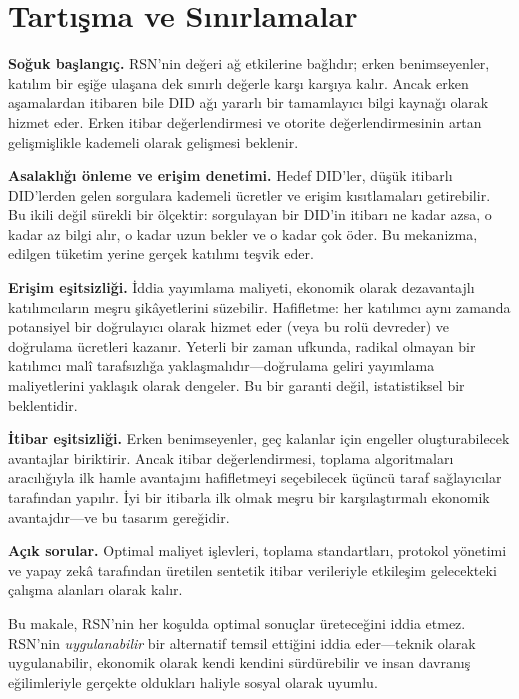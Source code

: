 \documentclass[11pt,a4paper,twocolumn]{article}
\begin{document}
\section{Tartışma ve Sınırlamalar}

\textbf{Soğuk başlangıç.} RSN'nin değeri ağ etkilerine bağlıdır; erken benimseyenler, katılım bir eşiğe ulaşana dek sınırlı değerle karşı karşıya kalır. Ancak erken aşamalardan itibaren bile DID ağı yararlı bir tamamlayıcı bilgi kaynağı olarak hizmet eder. Erken itibar değerlendirmesi ve otorite değerlendirmesinin artan gelişmişlikle kademeli olarak gelişmesi beklenir.

\textbf{Asalaklığı önleme ve erişim denetimi.} Hedef DID'ler, düşük itibarlı DID'lerden gelen sorgulara kademeli ücretler ve erişim kısıtlamaları getirebilir. Bu ikili değil sürekli bir ölçektir: sorgulayan bir DID'in itibarı ne kadar azsa, o kadar az bilgi alır, o kadar uzun bekler ve o kadar çok öder. Bu mekanizma, edilgen tüketim yerine gerçek katılımı teşvik eder.

\textbf{Erişim eşitsizliği.} İddia yayımlama maliyeti, ekonomik olarak dezavantajlı katılımcıların meşru şikâyetlerini süzebilir. Hafifletme: her katılımcı aynı zamanda potansiyel bir doğrulayıcı olarak hizmet eder (veya bu rolü devreder) ve doğrulama ücretleri kazanır. Yeterli bir zaman ufkunda, radikal olmayan bir katılımcı malî tarafsızlığa yaklaşmalıdır---doğrulama geliri yayımlama maliyetlerini yaklaşık olarak dengeler. Bu bir garanti değil, istatistiksel bir beklentidir.

\textbf{İtibar eşitsizliği.} Erken benimseyenler, geç kalanlar için engeller oluşturabilecek avantajlar biriktirir. Ancak itibar değerlendirmesi, toplama algoritmaları aracılığıyla ilk hamle avantajını hafifletmeyi seçebilecek üçüncü taraf sağlayıcılar tarafından yapılır. İyi bir itibarla ilk olmak meşru bir karşılaştırmalı ekonomik avantajdır---ve bu tasarım gereğidir.

\textbf{Açık sorular.} Optimal maliyet işlevleri, toplama standartları, protokol yönetimi ve yapay zekâ tarafından üretilen sentetik itibar verileriyle etkileşim gelecekteki çalışma alanları olarak kalır.

Bu makale, RSN'nin her koşulda optimal sonuçlar üreteceğini iddia etmez. RSN'nin \emph{uygulanabilir} bir alternatif temsil ettiğini iddia eder---teknik olarak uygulanabilir, ekonomik olarak kendi kendini sürdürebilir ve insan davranış eğilimleriyle gerçekte oldukları haliyle sosyal olarak uyumlu.
\end{document}
